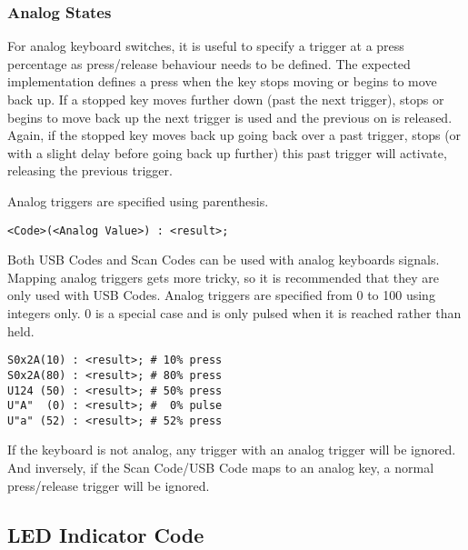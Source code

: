 \documentclass{kiibohd-template}
\begin{document}


\subsubsection{Analog States}

For analog keyboard switches, it is useful to specify a trigger at a press percentage as press/release behaviour needs to be defined.
The expected implementation defines a press when the key stops moving or begins to move back up.
If a stopped key moves further down (past the next trigger), stops or begins to move back up the next trigger is used and the previous on is released.
Again, if the stopped key moves back up going back over a past trigger, stops (or with a slight delay before going back up further) this past trigger will activate, releasing the previous trigger.

Analog triggers are specified using parenthesis.

\begin{lstlisting}
<Code>(<Analog Value>) : <result>;
\end{lstlisting}

Both USB Codes and Scan Codes can be used with analog keyboards signals.
Mapping analog triggers gets more tricky, so it is recommended that they are only used with USB Codes.
Analog triggers are specified from 0 to 100 using integers only.
0 is a special case and is only pulsed when it is reached rather than held.

\begin{lstlisting}
S0x2A(10) : <result>; # 10% press
S0x2A(80) : <result>; # 80% press
U124 (50) : <result>; # 50% press
U"A"  (0) : <result>; #  0% pulse
U"a" (52) : <result>; # 52% press
\end{lstlisting}

If the keyboard is not analog, any trigger with an analog trigger will be ignored.
And inversely, if the Scan Code/USB Code maps to an analog key, a normal press/release trigger will be ignored.


\subsection{LED Indicator Code}
\label{subsec:LED_Indicator_Code}
\end{document}
